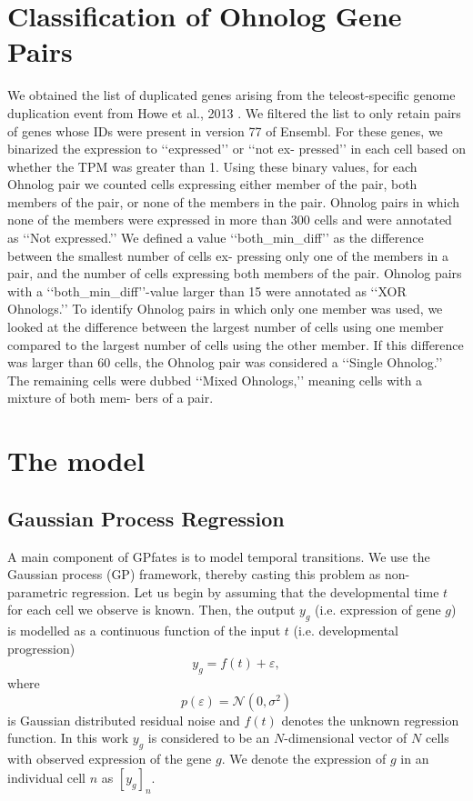 \section{Classification of Ohnolog Gene Pairs}

We obtained the list of duplicated genes arising from the teleost-specific genome duplication event from Howe et al., 2013  \cite{Howe2013-ul}. We filtered the list to only retain pairs of genes whose IDs were present in version 77 of Ensembl. For these genes, we binarized the expression to ‘‘expressed’’ or ‘‘not ex- pressed’’ in each cell based on whether the TPM was greater than 1. Using these binary values, for each Ohnolog pair we counted cells expressing either member of the pair, both members of the pair, or none of the members in the pair. Ohnolog pairs in which none of the members were expressed in more than 300 cells and were annotated as ‘‘Not expressed.’’ We defined a value ‘‘both\_min\_diff’’ as the difference between the smallest number of cells ex- pressing only one of the members in a pair, and the number of cells expressing both members of the pair. Ohnolog pairs with a ‘‘both\_min\_diff’’-value larger than 15 were annotated as ‘‘XOR Ohnologs.’’ To identify Ohnolog pairs in which only one member was used, we looked at the difference between the largest number of cells using one member compared to the largest number of cells using the other member. If this difference was larger than 60 cells, the Ohnolog pair was considered a ‘‘Single Ohnolog.’’ The remaining cells were dubbed ‘‘Mixed Ohnologs,’’ meaning cells with a mixture of both mem- bers of a pair.

\section{The  model}

\subsection{Gaussian Process Regression}

A main component of GPfates is to model temporal transitions.  We use the Gaussian process (GP) framework, thereby casting this problem as non-parametric regression. Let us begin by assuming that the developmental time $ t $ for each cell we observe is known. Then, the output $ y_g $ (i.e. expression of gene $ g $) is modelled as a continuous function of the input $ t $ (i.e. developmental progression)
\begin{equation}
\label{eq:gpregression}
y_g = f(t) + \varepsilon,
\end{equation}
where
$$ p(\varepsilon) = \mathcal{N}(0, \sigma^2) $$ is Gaussian distributed residual noise and $ f(t) $ denotes the unknown regression function. In this work $ y_g $ is considered to be an $ N $-dimensional vector of $ N $ cells with observed expression of the gene $ g $. We denote the expression of $ g $ in an individual cell $ n $ as $ [y_g]_n $.

